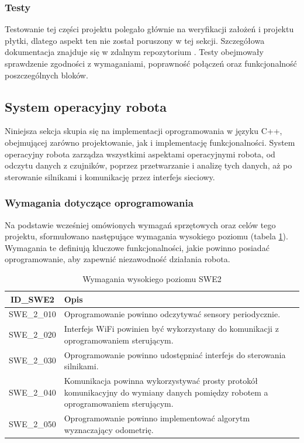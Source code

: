 \documentclass[12pt,twoside]{article}
\begin{document}
\subsubsection{Testy}
Testowanie tej części projektu polegało głównie na weryfikacji założeń i projektu płytki, dlatego aspekt ten nie został poruszony w tej sekcji. Szczegółowa dokumentacja znajduje się w zdalnym repozytorium \cite{repo}. Testy obejmowały sprawdzenie zgodności z wymaganiami, poprawność połączeń oraz funkcjonalność poszczególnych bloków.

\newpage

\subsection{System operacyjny robota}

Niniejsza sekcja skupia się na implementacji oprogramowania w języku C++\cite{cpp}, obejmującej zarówno projektowanie, jak i implementację funkcjonalności. System operacyjny robota zarządza wszystkimi aspektami operacyjnymi robota, od odczytu danych z czujników, poprzez przetwarzanie i analizę tych danych, aż po sterowanie silnikami i komunikację  przez interfejs sieciowy.

\subsubsection{Wymagania dotyczące oprogramowania}

Na podstawie wcześniej omówionych wymagań sprzętowych oraz celów tego projektu, sformułowano następujące wymagania wysokiego poziomu (tabela \ref{Tab:SWE2}). Wymagania te definiują kluczowe funkcjonalności, jakie powinno posiadać oprogramowanie, aby zapewnić niezawodność działania robota.

\begin{table}[ht]
\caption{Wymagania wysokiego poziomu SWE2}
\centering		
	\begin{tabular}{|c|p{}|}	
		\hline
		ID\_SWE2 & Opis \\
		\hline
		SWE\_2\_010 & Oprogramowanie powinno odczytywać sensory periodycznie. \\
		\hline
		SWE\_2\_020 & Interfejs WiFi powinien być wykorzystany do komunikacji z oprogramowaniem sterującym. \\
		\hline 
		SWE\_2\_030 & Oprogramowanie powinno udostępniać interfejs do sterowania silnikami.\\
		\hline
		SWE\_2\_040 & Komunikacja powinna wykorzystywać prosty protokół komunikacyjny do wymiany danych pomiędzy robotem a oprogramowaniem sterującym. \\
		\hline
		SWE\_2\_050 & Oprogramowanie powinno implementować algorytm wyznaczający odometrię. \\
		\hline

	\end{tabular}	
	
\label{Tab:SWE2}
\end{table}	
\end{document}
